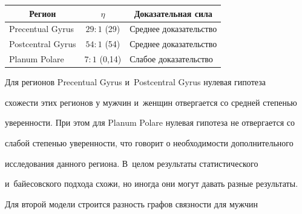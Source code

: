      

       \begin{table}\small %

       \begin{center}


      \vspace*{2ex}

      

      \begin{tabular}{|l|c|l|}

      \hline

\multicolumn{1}{|c|}{Регион}&$\eta$&\multicolumn{1}{c|}{Доказательная сила}\\

      \hline

Precentual Gyrus&$29:1$ (29)&Среднее доказательство\\

Postcentral Gyrus&$54:1$ (54)&Среднее доказательство\\

Planum Polare&\hphantom{,99}$7:1$ (0,14)&Слабое доказательство\\

      \hline

      \end{tabular}

      \end{center}

      \end{table}

      

      

     Для регионов Precentual Gyrus и~Postcentral Gyrus нулевая гипотеза 

схожести этих регионов у мужчин и~женщин отвергается со средней степенью 

уверенности. При этом для Planum Polare нулевая гипотеза не отвергается со 

слабой степенью уверенности, что говорит о необходимости дополнительного 

исследования данного региона. В~целом результаты статистического 

и~байесовского подхода схожи, но иногда они могут давать разные результаты. 

     

     Для второй модели строится разность графов связности для мужчин 

